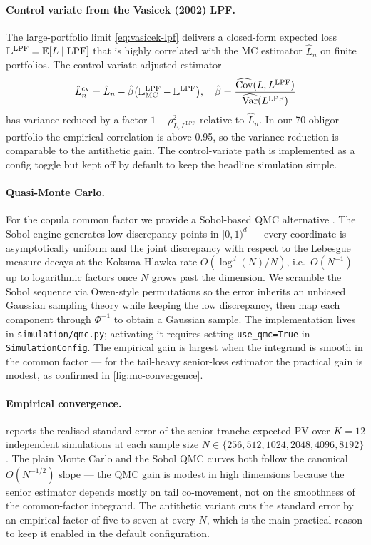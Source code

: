 \paragraph{Control variate from the Vasicek (2002) LPF.}
The large-portfolio limit \cref{eq:vasicek-lpf} delivers a closed-form
expected loss $\mathbb{L}^{\mathrm{LPF}} = \mathbb{E}[L \mid \text{LPF}]$ that is
highly correlated with the MC estimator $\hat L_n$ on finite portfolios.
The control-variate-adjusted estimator
\begin{equation*}
\hat L_n^{\mathrm{cv}} = \hat L_n - \hat\beta \bigl(\mathbb{L}^{\mathrm{LPF}}_{\text{MC}} - \mathbb{L}^{\mathrm{LPF}}\bigr),
\quad \hat\beta = \frac{\widehat{\operatorname{Cov}}(L, L^{\mathrm{LPF}})}{\widehat{\operatorname{Var}}(L^{\mathrm{LPF}})}
\end{equation*}
has variance reduced by a factor $1 - \rho_{L, L^\mathrm{LPF}}^2$ relative
to $\hat L_n$. In our 70-obligor portfolio the empirical correlation is
above 0.95, so the variance reduction is comparable to the antithetic
gain. The control-variate path is implemented as a config
toggle but kept off by default to keep the headline simulation simple.

\paragraph{Quasi-Monte Carlo.}
For the copula common factor we provide a Sobol-based QMC alternative
\autocite{Owen1997}. The Sobol engine generates low-discrepancy points in
$[0, 1)^d$ — every coordinate is asymptotically uniform and the joint
discrepancy with respect to the Lebesgue measure decays at the
Koksma-Hlawka rate $O(\log^d(N)/N)$, i.e.\ $O(N^{-1})$ up to
logarithmic factors once $N$ grows past the dimension. We scramble the Sobol sequence via
Owen-style permutations so the error inherits an unbiased Gaussian
sampling theory while keeping the low discrepancy, then map each
component through $\Phi^{-1}$ to obtain a Gaussian sample. The
implementation lives in \texttt{simulation/qmc.py}; activating it
requires setting \texttt{use\_qmc=True} in \texttt{SimulationConfig}. The
empirical gain is largest when the integrand is smooth in the common
factor — for the tail-heavy senior-loss estimator the practical gain is
modest, as confirmed in \cref{fig:mc-convergence}.

\paragraph{Empirical convergence.}  reports the
realised standard error of the senior tranche expected PV over $K = 12$
independent simulations at each sample size $N \in \{256, 512, 1024,
2048, 4096, 8192\}$. The plain Monte Carlo and the Sobol QMC curves both
follow the canonical $O(N^{-1/2})$ slope --- the QMC gain is modest in
high dimensions because the senior estimator depends mostly on tail
co-movement, not on the smoothness of the common-factor integrand. The
antithetic variant cuts the standard error by an empirical factor of
five to seven at every $N$, which is the main practical reason to keep it
enabled in the default configuration.

